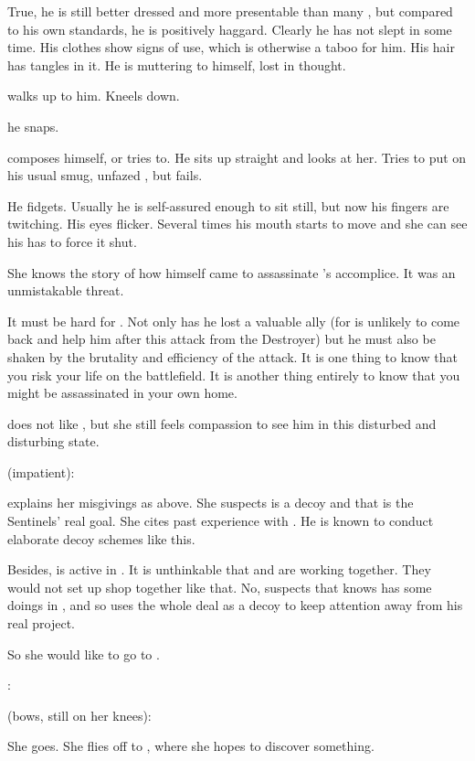 True, he is still better dressed and more presentable than many \resphain, but compared to his own standards, he is positively haggard. 
Clearly he has not slept in some time. 
His clothes show signs of use, which is otherwise a taboo for him. 
His hair has tangles in it. 
He is muttering to himself, lost in thought. 

\Achsah walks up to him. 
Kneels down.

 he snaps.

\Teshrial composes himself, or tries to. 
He sits up straight and looks at her. 
Tries to put on his usual smug, unfazed \facade, but fails. 

He fidgets. 
Usually he is self-assured enough to sit still, but now his fingers are twitching. 
His eyes flicker. 
Several times his mouth starts to move and she can see his has to force it shut. 

She knows the story of how \Ishnaruchaefir himself came to assassinate \Teshrial's accomplice. 
It was an unmistakable threat. 

It must be hard for \Teshrial. 
Not only has he lost a valuable ally (for \Urizeth is unlikely to come back and help him after this attack from the Destroyer) but he must also be shaken by the brutality and efficiency of the attack. 
It is one thing to know that you risk your life on the battlefield. 
It is another thing entirely to know that you might be assassinated in your own home.

\Achsah does not like \Teshrial, but she still feels compassion to see him in this disturbed and disturbing state.


\Teshrial (impatient): 

\Achsah explains her misgivings as above. 
She suspects \Malcur is a decoy and that \Forklin is the Sentinels' real goal. 
She cites past experience with \Secherdamon. 
He is known to conduct elaborate decoy schemes like this. 

Besides, \Ishnaruchaefir is active in \Malcur. 
It is unthinkable that \Ishnaruchaefir and \Secherdamon are working together. 
They would not set up shop together like that. 
No, \Achsah suspects that \Secherdamon knows \Ishnaruchaefir has some doings in \Malcur, and so uses the whole \Malcur deal as a decoy to keep attention away from his real project. 

So she would like to go to \Forklin. 

\Teshrial:

\Achsah (bows, still on her knees):

She goes. 
She flies off to \Forklin, where she hopes to discover something. 









